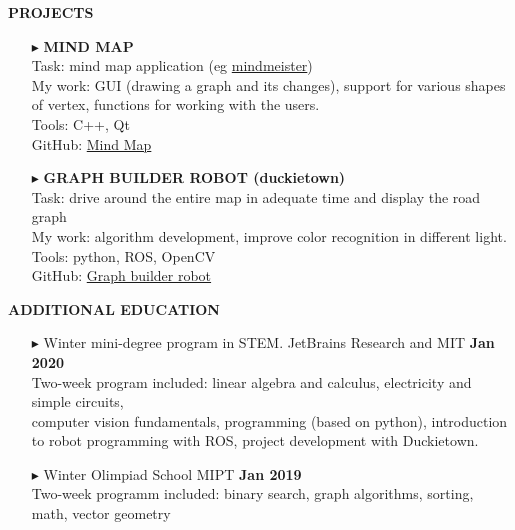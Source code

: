 \documentclass[a4paper,10pt]{article}
\begin{document}
	\colorbox{magicmint}{
		\begin{minipage}{0.96\textwidth}
			\vphantom{.}
			\textbf{PROJECTS}
		\end{minipage}
	}
	\begin{itemize}
	
		\item[$\blacktriangleright$] \textbf{MIND MAP}\\
		Task: mind map application (eg \href{https://www.mindmeister.com} {mindmeister})\\
		My work: GUI (drawing a graph and its changes), support for various shapes of vertex, functions for working with the users. \\
		Tools: C++, Qt\\
		GitHub: \href{https://github.com/Kira5005-code/Mind-Map} {Mind Map}
		
		\item[$\blacktriangleright$] \textbf{GRAPH BUILDER ROBOT (duckietown)}\\
		Task: drive around the entire map in adequate time and display the road graph\\
		My  work: algorithm development, improve color recognition in different light. \\
		Tools: python, ROS, OpenCV\\
		GitHub: \href{https://github.com/Kira5005-code/template-ros-core} {Graph builder robot}
	\end{itemize}

	\colorbox{magicmint}{
		\begin{minipage}{0.96\textwidth}
			\vphantom{.}
			\textbf{ADDITIONAL EDUCATION}
		\end{minipage}
	}
	
	\begin{itemize}
		\item[$\blacktriangleright$]  Winter mini-degree program in STEM. JetBrains Research and MIT \hspace{4.7cm}\textbf{Jan 2020} \\ 
		Two-week program included: linear algebra and calculus, electricity and simple circuits,\\ computer vision fundamentals, programming (based on python), introduction to robot programming with ROS, project development with Duckietown.
		\item[$\blacktriangleright$]  Winter Olimpiad School MIPT \hspace{10.4cm}\textbf{Jan 2019} \\ Two-week programm included: binary search, graph algorithms, sorting, math, vector geometry
	\end{itemize}
	
\end{document}

